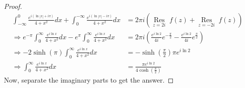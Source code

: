 \begin{proof}
\begin{align*}
\int_{-\infty}^0 \frac{e^{i(\ln|x|+i\pi)}}{4+x^2}dx +\int_0^{-\infty} \frac{e^{i(\ln|x|-i\pi)}}{4+x^2}dx &= 2\pi i \left(\mathop{\text{Res}}\limits_{z=2i} \; f(z) + \mathop{\text{Res}}\limits_{z=-2i} \; f(z)\right) \\
\Rightarrow e^{-\pi}\int_0^\infty \frac{e^{i\ln x}}{4+x^2}dx - e^{\pi}\int_0^\infty \frac{e^{i\ln x}}{4+x^2}dx &= 2\pi i \left( \frac{e^{i\ln 2}}{4i}e^{-\frac{\pi}{2}}- \frac{e^{i\ln 2}}{4i}e^{\frac{\pi}{2}}\right) \\
\Rightarrow -2\sinh(\pi) \int_0^\infty \frac{e^{i\ln x}}{4+x^2}dx  &= -\sinh\left(\frac{\pi}{2}\right) \pi e^{i\ln 2} \\
\Rightarrow \int_0^\infty \frac{e^{i\ln x}}{4+x^2}dx &= \frac{\pi e^{i\ln 2}}{4\cosh\left(\frac{\pi}{2}\right)}
\end{align*}
Now, separate the imaginary parts to get the answer.
\end{proof}